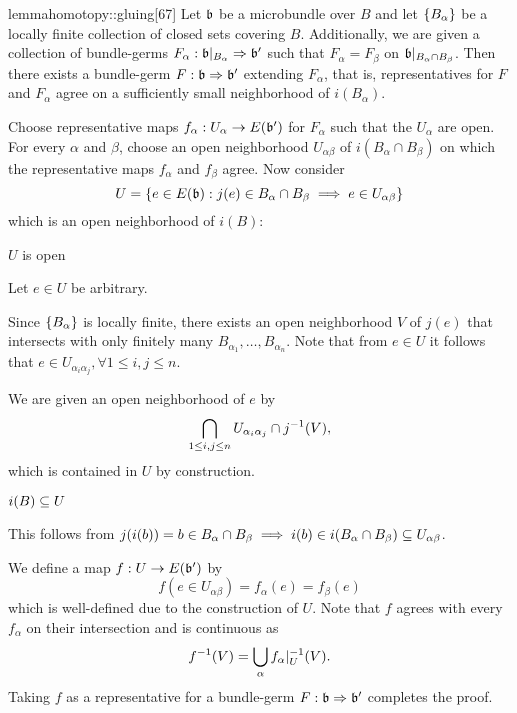 \begin{mystatement}{lemma}{homotopy::gluing}[67] Let $\bb$ be a microbundle over $B$ and let $\{B_\alpha\}$ be a locally finite collection of closed sets covering $B$. Additionally, we are given a collection of bundle-germs $\germdef{F_\alpha}{\bb[B_\alpha]}{\bb'}$ such that $F_\alpha = F_\beta$ on $\bb[B_\alpha \cap B_\beta]$. Then there exists a bundle-germ $\germdef{F}{\bb}{\bb'}$ extending $F_\alpha$, that is, representatives for $F$ and $F_\alpha$ agree on a sufficiently small neighborhood of $i(B_\alpha)$. \end{mystatement}

\begin{myproof} Choose representative maps $f_\alpha: U_\alpha \to E(\bb')$ for $F_\alpha$ such that the $U_\alpha$ are open. For every $\alpha$ and $\beta$, choose an open neighborhood $U_{\alpha\beta}$ of $i(B_\alpha \cap B_\beta)$ on which the representative maps $f_\alpha$ and $f_\beta$ agree. Now consider \[ U = \set{ e \in E(\bb)}{j(e) \in B_\alpha \cap B_\beta \implies e \in U_{\alpha\beta}} \] which is an open neighborhood of $i(B)$: \begin{sectionize} \item $U$ is open

Let $e \in U$ be arbitrary.

Since $\{B_\alpha\}$ is locally finite, there exists an open neighborhood $V$ of $j(e)$ that intersects with only finitely many $B_{\alpha_1}, \dots, B_{\alpha_n}$. Note that from $e \in U$ it follows that $e \in U_{\alpha_i\alpha_j}, \forall 1 \le i, j \le n$.

We are given an open neighborhood of $e$ by \[ \bigcap_{1 \le i, j \le n} U_{\alpha_i\alpha_j} \cap j^{-1}(V), \] which is contained in $U$ by construction.

\item $i(B) \subseteq{} U$

This follows from $j(i(b)) = b \in B_\alpha \cap B_\beta \implies i(b) \in i(B_\alpha \cap B_\beta) \subseteq{} U_{\alpha\beta}$. \end{sectionize} We define a map $f: U \to E(\bb')$ by \[ f(e \in U_{\alpha\beta}) = f_\alpha(e) = f_\beta(e) \] which is well-defined due to the construction of $U$. Note that $f$ agrees with every $f_\alpha$ on their intersection and is continuous as \[ f^{-1}(V) = \bigcup_{\alpha} f_\alpha\vert_{U}^{-1}(V). \] Taking $f$ as a representative for a bundle-germ $\germdef{F}{\bb}{\bb'}$ completes the proof. \end{myproof}